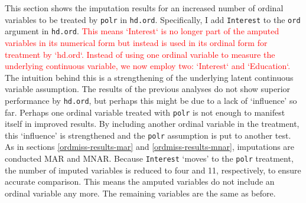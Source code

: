 \documentclass[12pt,econ]{sources/authesis}
\begin{document}
This section shows the imputation results for an increased number of ordinal variables to be treated by \texttt{polr} in \texttt{hd.ord}. Specifically, I add \texttt{Interest} to the \texttt{ord} argument in \texttt{hd.ord}. \textcolor{red}{This means `Interest` is no longer part of the amputed variables in its numerical form but instead is used in its ordinal form for treatment by `hd.ord`. Instead of using one ordinal variable to measure the underlying continuous variable, we now employ two: `Interest` and `Education`.} The intuition behind this is a strengthening of the underlying latent continuous variable assumption. The results of the previous analyses do not show superior performance by \texttt{hd.ord}, but perhaps this might be due to a lack of `influence' so far. Perhaps one ordinal variable treated with \texttt{polr} is not enough to manifest itself in improved results. By including another ordinal variable in the treatment, this `influence' is strengthened and the \texttt{polr} assumption is put to another test. As in sections \ref{ordmiss-results-mar} and \ref{ordmiss-results-mnar}, imputations are conducted MAR and MNAR. Because \texttt{Interest} `moves' to the \texttt{polr} treatment, the number of imputed variables is reduced to four and 11, respectively, to ensure accurate comparison. This means the amputed variables do not include an ordinal variable any more. The remaining variables are the same as before.
\end{document}
